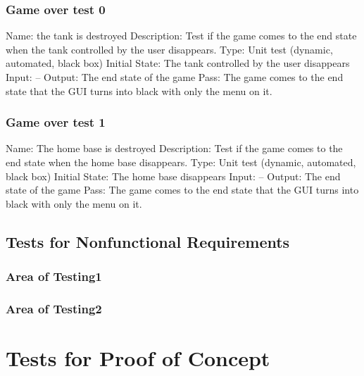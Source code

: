 \documentclass{article}
\begin{document}
\subsubsection{Game over test 0}
Name:  the tank is destroyed\newline
Description: Test if the game comes to the end state when the tank controlled by the user disappears. \newline
Type: Unit test (dynamic, automated, black box) \newline
Initial State:  The tank controlled by the user disappears\newline
Input: --\newline
Output: The end state of the game \newline
Pass:  The game comes to the end state that the GUI turns into black with only the menu on it. \newline

\subsubsection{Game over test 1}
Name:  The home base is destroyed\newline
Description: Test if the game comes to the end state when the home base disappears. \newline
Type: Unit test (dynamic, automated, black box) \newline
Initial State:  The home base disappears \newline
Input: --\newline
Output: The end state of the game \newline
Pass:  The game comes to the end state that the GUI turns into black with only the menu on it. \newline





\subsection{Tests for Nonfunctional Requirements}
\subsubsection{Area of Testing1}
\subsubsection{Area of Testing2}

\section{Tests for Proof of Concept}
\end{document}
